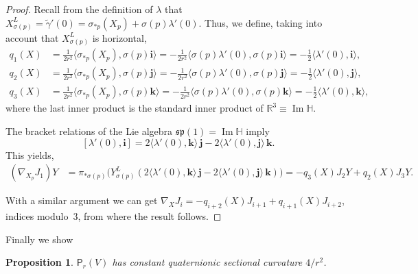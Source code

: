 \documentclass[12pt, a4paper,draft]{amsart}
\newcommand{\g}{\mathfrak}
\newcommand{\R}{\mathbb{R}}
\renewcommand{\H}{\mathbb{H}}
\renewcommand{\Im}{\operatorname{Im}}
\newtheorem{proposition}[theorem]{Proposition}
\theoremstyle{remark}
\begin{document}
\begin{proof}
Recall from the definition of $\lambda$ that 
$X_{\sigma(p)}^L=\tilde{\gamma}'(0)=\sigma_{*p}(X_p)+\sigma(p)\lambda'(0)$.
Thus, we define, taking into account that $X_{\sigma(p)}^L$ is horizontal,
\[
\begin{aligned}
q_1(X)&{}=\frac{1}{2r^2}\langle\sigma_{*p}(X_p),\sigma(p)\mathbf{i}\rangle
=-\frac{1}{2r^2}\langle \sigma(p)\lambda'(0),\sigma(p)\mathbf{i}\rangle
=-\frac{1}{2}\langle \lambda'(0),\mathbf{i}\rangle,\\
q_2(X)&{}=\frac{1}{2r^2}\langle\sigma_{*p}(X_p),\sigma(p)\mathbf{j}\rangle
=-\frac{1}{2r^2}\langle \sigma(p)\lambda'(0),\sigma(p)\mathbf{j}\rangle
=-\frac{1}{2}\langle \lambda'(0),\mathbf{j}\rangle,\\
q_3(X)&{}=\frac{1}{2r^2}\langle\sigma_{*p}(X_p),\sigma(p)\mathbf{k}\rangle
=-\frac{1}{2r^2}\langle \sigma(p)\lambda'(0),\sigma(p)\mathbf{k}\rangle
=-\frac{1}{2}\langle \lambda'(0),\mathbf{k}\rangle,
\end{aligned}
\]
where the last inner product is the standard inner product of $\R^3\equiv\Im\H$.

The bracket relations of the Lie algebra $\g{sp}(1)=\Im\H$ imply
\[
[\lambda'(0),\mathbf{i}]
=2\langle\lambda'(0),\mathbf{k}\rangle\,\mathbf{j}-2\langle\lambda'(0),\mathbf{j}\rangle\,\mathbf{k}.
\]
This yields,
\[
\begin{aligned}
(\nabla_{X_p}J_1)Y
&{}=\pi_{*\sigma(p)}\bigl(Y_{\sigma(p)}^L(2\langle\lambda'(0),\mathbf{k}\rangle\,\mathbf{j}-2\langle\lambda'(0),\mathbf{j}\rangle\,\mathbf{k})\bigr)
=-q_3(X)J_2 Y+q_2(X)J_3 Y.
\end{aligned}
\]

With a similar argument we can get $\nabla_X J_i=-q_{i+2}(X)J_{i+1}+q_{i+1}(X)J_{i+2}$, indices modulo~3, from where the result follows.
\end{proof}

Finally we show

\begin{proposition}
$\mathsf{P}_r(V)$ has constant quaternionic sectional curvature $4/r^2$.
\end{proposition}
\end{document}
